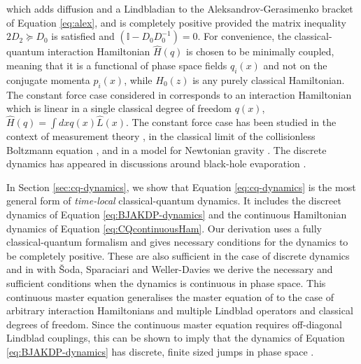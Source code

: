 \documentclass[aps,pra,showpacs,citeautoscript,amsmath,amssymb,floatfix,superscriptaddress,bbm, verbatim,amsfonts,changes,11pt,nofootinbib,longbibliography]{revtex4-2}
\def\z{{z}}
\def\L{{\hat{L}}}
\def\Hq{\hat{H}}
\begin{document}
which adds diffusion and a Lindbladian to the Aleksandrov-Gerasimenko bracket of Equation \eqref{eq:alex}, and is completely positive provided the matrix inequality $2D_2\succeq D_0$ is satisfied and $(\mathbb{I}- D_0 D_0^{-1}) =0$.  For convenience, the classical-quantum interaction Hamiltonian $\Hq(q)$ is chosen to be minimally coupled, meaning that it is a functional of phase space fields $q_i(x)$ and not on the conjugate momenta $p_i(x)$, while $H_0(\z)$ is any purely classical Hamiltonian.
The constant force case considered in  \cite{diosi1995quantum} corresponds to an interaction Hamiltonian which is linear in a single classical degree of freedom $q(x)$,  $\Hq(q)=\int dx q(x)\L(x)$.  The constant force case has
been studied in the context of measurement theory \cite{diosi2014hybrid}, in the classical limit of the collisionless Boltzmann equation \cite{alicki2003completely}, and in a model for Newtonian gravity \cite{diosi2011gravity}. The discrete dynamics has appeared in discussions around black-hole evaporation \cite{poulinKITP}. %


 In Section \ref{sec:cq-dynamics}, we show that Equation \eqref{eq:cq-dynamics} is the most general form of  {\it time-local} \cite{ktimelocal_foot}
  classical-quantum dynamics. It includes the discreet dynamics of Equation \eqref{eq:BJAKDP-dynamics} and the continuous Hamiltonian dynamics of Equation \eqref{eq:CQcontinuousHam}.
 Our derivation uses a fully classical-quantum formalism and gives necessary conditions for the dynamics to be completely positive. %
These are also sufficient in the case of discrete dynamics and in  \cite{UCLPawula} with  Šoda, Sparaciari and Weller-Davies we derive the necessary and sufficient conditions when the dynamics is continuous in phase space.\label{par:necsuf} This continuous master equation generalises the master equation of  \cite{diosi1995quantum} to the case of arbitrary interaction Hamiltonians and multiple Lindblad operators and classical degrees of freedom. Since the continuous master equation requires off-diagonal Lindblad couplings, this can be shown to imply that the dynamics of Equation \eqref{eq:BJAKDP-dynamics}  has discrete, finite sized jumps in phase space \cite{UCLPawula}. 
\end{document}
